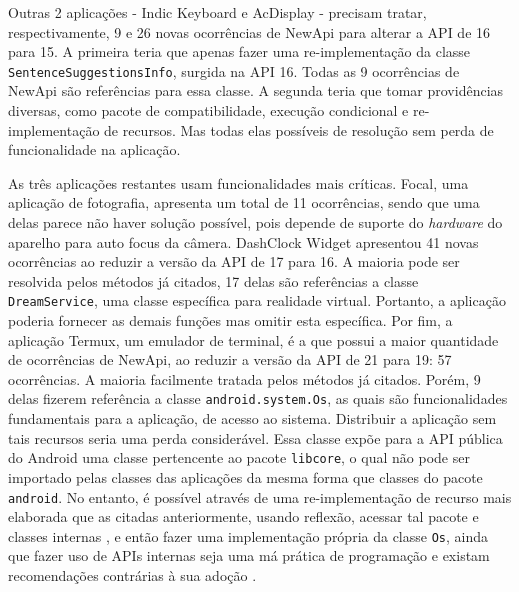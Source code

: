 Outras 2 aplicações - Indic Keyboard e AcDisplay - precisam tratar, respectivamente,
9 e 26 novas ocorrências de NewApi para alterar a API de 16 para 15. A primeira teria
que apenas fazer uma re-implementação da classe \texttt{SentenceSuggestionsInfo},
surgida na API 16. Todas as 9 ocorrências de NewApi são referências para essa classe.
A segunda teria que tomar providências diversas, como pacote de compatibilidade, execução
condicional e re-implementação de recursos. Mas todas elas possíveis de resolução sem perda
de funcionalidade na aplicação.

As três aplicações restantes usam funcionalidades mais críticas. Focal, uma
aplicação de fotografia, apresenta um total de 11 ocorrências, sendo que uma
delas parece não haver solução possível, pois depende de suporte do \textit{hardware}
do aparelho para auto focus da câmera. DashClock Widget apresentou 41 novas
ocorrências ao reduzir a versão da API de 17 para 16. A maioria pode ser
resolvida pelos métodos já citados, 17 delas são referências a classe
\texttt{DreamService}, uma classe específica para realidade virtual.
Portanto, a aplicação poderia fornecer as demais funções mas omitir esta
específica. Por fim, a aplicação Termux, um emulador de terminal, é a que
possui a maior quantidade de ocorrências de NewApi, ao reduzir a versão da
API de 21 para 19: 57 ocorrências. A maioria facilmente tratada pelos métodos
já citados. Porém, 9 delas fizerem referência a classe \texttt{android.system.Os},
as quais são funcionalidades fundamentais para a aplicação, de acesso ao sistema.
Distribuir a aplicação sem tais recursos seria uma perda considerável. Essa classe
expõe para a API pública do Android uma classe pertencente ao pacote \texttt{libcore},
o qual não pode ser importado pelas classes das aplicações da mesma forma que classes
do pacote \texttt{android}. No entanto, é possível através de uma re-implementação de
recurso mais elaborada que as citadas anteriormente, usando reflexão, acessar tal pacote
e classes internas \cite{Libcore}, e então fazer uma implementação própria da classe \texttt{Os},
ainda que fazer uso de APIs internas seja uma má prática de programação e existam
recomendações contrárias à sua adoção \cite{Businge2015} \cite{Mastrangelo2015}.

